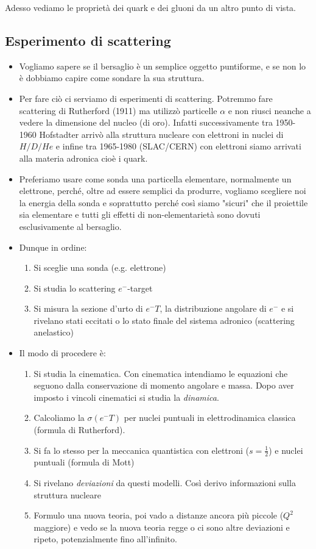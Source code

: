 Adesso vediamo le proprietà dei quark e dei gluoni da un altro punto di vista. 
\subsection{Esperimento di scattering}
\begin{itemize}
    \item Vogliamo sapere se il bersaglio è un semplice oggetto puntiforme, e se non lo è dobbiamo capire come sondare la sua struttura. 
    \item Per fare ciò ci serviamo di esperimenti di scattering. Potremmo fare scattering di Rutherford (1911) ma utilizzò particelle $\alpha$ e non riusci neanche a vedere la dimensione del nucleo (di oro). Infatti successivamente tra 1950-1960 Hofstadter arrivò alla struttura nucleare con elettroni in nuclei di $H/D/He$ e infine tra 1965-1980 (SLAC/CERN) con elettroni siamo arrivati alla materia adronica cioè i quark.
    \item Preferiamo usare come sonda una particella elementare, normalmente un elettrone, perché, oltre ad essere semplici da produrre, vogliamo scegliere noi la energia della sonda e soprattutto perché così siamo "sicuri" che il proiettile sia elementare e tutti gli effetti di non-elementarietà sono dovuti esclusivamente al bersaglio.
    \item Dunque in ordine:
    \begin{enumerate}
        \item Si sceglie una sonda (e.g. elettrone)
        \item Si studia lo scattering $e^-$-target 
        \item Si misura la sezione d'urto di $e^-T$, la distribuzione angolare di $e^-$ e si rivelano stati eccitati o lo stato finale del sistema adronico (scattering anelastico)
    \end{enumerate}
    \item Il modo di procedere è:
    \begin{enumerate}
        \item Si studia la cinematica. Con cinematica intendiamo le equazioni che seguono dalla conservazione di momento angolare e massa. Dopo aver imposto i vincoli cinematici si studia la \textit{dinamica}. 
        \item Calcoliamo la $\sigma(e^-T)$ per nuclei puntuali in elettrodinamica classica (formula di Rutherford).
        \item Si fa lo stesso per la meccanica quantistica con elettroni ($s=\frac12$) e nuclei puntuali (formula di Mott)
        \item Si rivelano \textit{deviazioni} da questi modelli. Così derivo informazioni sulla struttura nucleare
        \item Formulo una nuova teoria, poi vado a distanze ancora più piccole ($Q^2$ maggiore) e vedo se la nuova teoria regge o ci sono altre deviazioni e ripeto, potenzialmente fino all'infinito.
    \end{enumerate}
\end{itemize}
